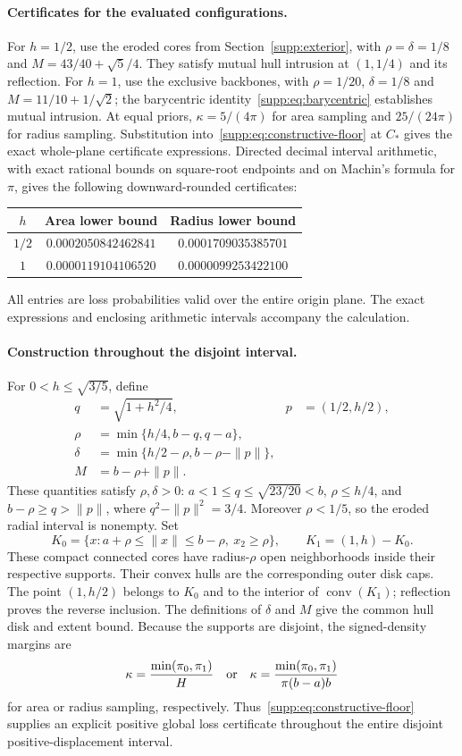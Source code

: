 \paragraph{Certificates for the evaluated configurations.}
For $h=1/2$, use the eroded cores from Section~\ref{supp:exterior}, with $\rho=\delta=1/8$ and $M=43/40+\sqrt5/4$. They satisfy mutual hull intrusion at $(1,1/4)$ and its reflection. For $h=1$, use the exclusive backbones, with $\rho=1/20$, $\delta=1/8$ and $M=11/10+1/\sqrt2$; the barycentric identity~\eqref{supp:eq:barycentric} establishes mutual intrusion. At equal priors, $\kappa=5/(4\pi)$ for area sampling and $25/(24\pi)$ for radius sampling. Substitution into~\eqref{supp:eq:constructive-floor} at $C_*$ gives the exact whole-plane certificate expressions. Directed decimal interval arithmetic, with exact rational bounds on square-root endpoints and on Machin's formula for $\pi$, gives the following downward-rounded certificates:
\begin{center}
\begin{tabular}{ccc}
\toprule
$h$ & Area lower bound & Radius lower bound \\
\midrule
$1/2$ & $0.0002050842462841$ & $0.0001709035385701$ \\
$1$   & $0.0000119104106520$ & $0.0000099253422100$ \\
\bottomrule
\end{tabular}
\end{center}
All entries are loss probabilities valid over the entire origin plane. The exact expressions and enclosing arithmetic intervals accompany the calculation.

\paragraph{Construction throughout the disjoint interval.}
For $0<h\leq\sqrt{3/5}$, define
\begin{align*}
 q&=\sqrt{1+h^2/4},&p&=(1/2,h/2),\\
 \rho&=\min\{h/4,b-q,q-a\},\\
 \delta&=\min\{h/2-\rho,b-\rho-\|p\|\},\\
 M&=b-\rho+\|p\|.
\end{align*}
These quantities satisfy $\rho,\delta>0$: $a<1\leq q\leq\sqrt{23/20}<b$, $\rho\leq h/4$, and $b-\rho\geq q>\|p\|$, where $q^2-\|p\|^2=3/4$. Moreover $\rho<1/5$, so the eroded radial interval is nonempty. Set
\[
 K_0=\{x:a+\rho\leq\|x\|\leq b-\rho,\ x_2\geq\rho\},
 \qquad K_1=(1,h)-K_0.
\]
These compact connected cores have radius-$\rho$ open neighborhoods inside their respective supports. Their convex hulls are the corresponding outer disk caps. The point $(1,h/2)$ belongs to $K_0$ and to the interior of $\operatorname{conv}(K_1)$; reflection proves the reverse inclusion. The definitions of $\delta$ and $M$ give the common hull disk and extent bound. Because the supports are disjoint, the signed-density margins are
\[
 \kappa=\frac{\min(\pi_0,\pi_1)}H
 \quad\hbox{or}\quad
 \kappa=\frac{\min(\pi_0,\pi_1)}{\pi(b-a)b}
\]
for area or radius sampling, respectively. Thus~\eqref{supp:eq:constructive-floor} supplies an explicit positive global loss certificate throughout the entire disjoint positive-displacement interval.
